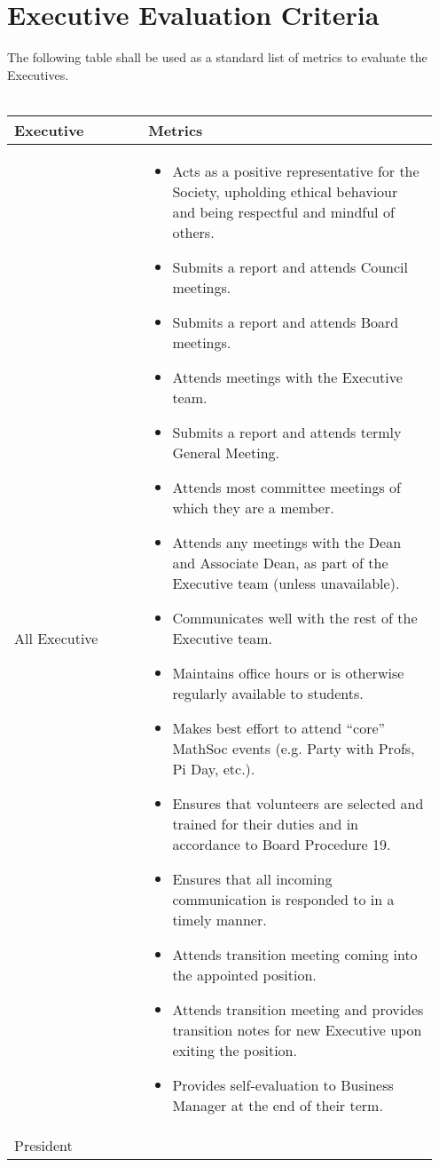 \section{Executive Evaluation Criteria}

The following table shall be used as a standard list of metrics to evaluate the Executives.\\
\\
\begin{longtable}{p{0.3\linewidth} p{0.65\linewidth}}
\toprule
Executive & Metrics\\
\midrule
All Executive &
\begin{itemize}
\item Acts as a positive representative for the Society, upholding ethical behaviour and being respectful and mindful of others.
\item Submits a report and attends Council meetings.
\item Submits a report and attends Board meetings.
\item Attends meetings with the Executive team.
\item Submits a report and attends termly General Meeting.
\item Attends most committee meetings of which they are a member.
\item Attends any meetings with the Dean and Associate Dean, as part of the Executive team (unless unavailable).
\item Communicates well with the rest of the Executive team.
\item Maintains office hours or is otherwise regularly available to students.
\item Makes best effort to attend “core” MathSoc events (e.g. Party with Profs, Pi Day, etc.).
\item Ensures that volunteers are selected and trained for their duties and in accordance to Board Procedure 19.
\item Ensures that all incoming communication is responded to in a timely manner.
\item Attends transition meeting coming into the appointed position.
\item Attends transition meeting and provides transition notes for new Executive upon exiting the position.
\item Provides self-evaluation to Business Manager at the end of their term.
\end{itemize}
\\
\midrule
President &
\begin{itemize}

\end{itemize}
\end{longtable}
